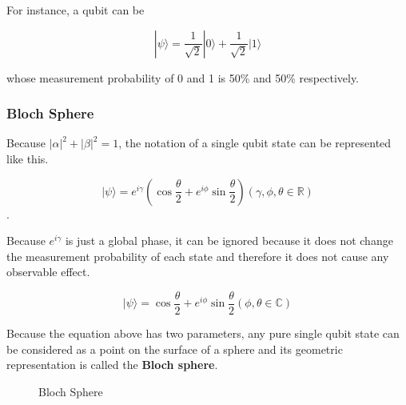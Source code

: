  For instance, a qubit can be 
 
\begin{equation}
	|\psi\rangle = \frac{1}{\sqrt{2}}|0\rangle + \frac{1}{\sqrt{2}}|1\rangle \tag{1}
\end{equation}

 whose measurement probability of 0 and 1 is 50\% and 50\% respectively.

\subsubsection{Bloch Sphere}
Because $|\alpha|^2 + |\beta|^2 = 1$, the notation of a single qubit state can be represented like this.

\begin{equation}
|\psi\rangle = e^{i\gamma} (\cos{\frac{\theta}{2}} + e^{i\phi} \sin{\frac{\theta}{2}}) (\gamma, \phi, \theta \in \mathbb{R})
\end{equation}.

Because $e^{i\gamma}$ is just a global phase, it can be ignored because it does not change the measurement probability of each state and therefore it does not cause any observable effect.

\begin{equation}
 |\psi\rangle =  \cos{\frac{\theta}{2}} + e^{i\phi} \sin{\frac{\theta}{2}} (\phi, \theta \in \mathbb{C})
\end{equation}

Because the equation above has two parameters, any pure single qubit state can be considered as a point on the surface of a sphere and its geometric representation is called the \textbf{Bloch sphere}.

\begin{figure}[ht]
  \centering
    
\newpage
\caption{Bloch Sphere}
\end{figure}

